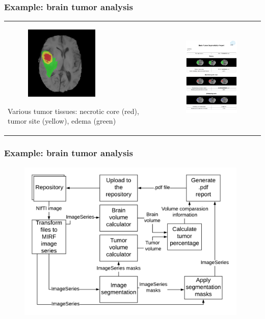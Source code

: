 \documentclass[xetex,mathserif,serif]{beamer}
\begin{document}
   \begin{frame}
     \frametitle{Example: brain tumor analysis}
    \begin{tabular}{p{5cm} p{7cm}}
        \begin{figure}[b]
             \centering
             \includegraphics[width=3.5cm]{pictures/brain_seg.png}
         \end{figure}
         Various tumor tissues: necrotic core (red),
         tumor site (yellow), edema (green)
         &
         \begin{figure}[b]
             \centering
             \includegraphics[width=4.8cm]{pictures/pdf.png}
         \end{figure}
     \end{tabular}
 \end{frame}
 
  \begin{frame}
     \frametitle{Example: brain tumor analysis}
        \begin{figure}
             \includegraphics[width=11cm]{pictures/brainsch.png}
         \end{figure}
 \end{frame}
\end{document}
